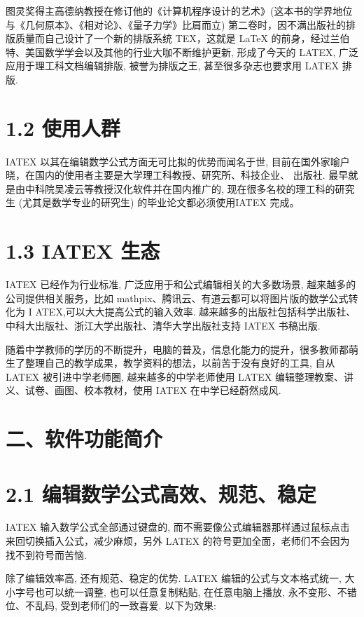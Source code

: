 \documentclass[10pt]{article}
\begin{document}
图灵奖得主高德纳教授在修订他的《计算机程序设计的艺术》(这本书的学界地位与《几何原本》、《相对论》、《量子力学》比肩而立) 第二卷时，因不满出版社的排版质量而自己设计了一个新的排版系统 TEX，这就是 LaTeX 的前身，经过兰伯特、美国数学学会以及其他的行业大咖不断维护更新, 形成了今天的 LATEX, 广泛应用于理工科文档编辑排版, 被誉为排版之王, 甚至很多杂志也要求用 LATEX 排版.

\section*{1.2 使用人群}

IATEX 以其在编辑数学公式方面无可比拟的优势而闻名于世, 目前在国外家喻户晓，在国内的使用者主要是大学理工科教授、研究所、科技企业、 出版社. 最早就是由中科院吴凌云等教授汉化软件并在国内推广的, 现在很多名校的理工科的研究生 (尤其是数学专业的研究生) 的毕业论文都必须使用IATEX 完成。

\section*{1.3 IATEX 生态}

IATEX 已经作为行业标准, 广泛应用于和公式编辑相关的大多数场景, 越来越多的公司提供相关服务，比如 mathpix、腾讯云、有道云都可以将图片版的数学公式转化为 \(\mathrm{I}\) ATEX,可以大大提高公式的输入效率. 越来越多的出版社包括科学出版社、中科大出版社、浙江大学出版社、清华大学出版社支持 IATEX 书稿出版.

随着中学教师的学历的不断提升，电脑的普及，信息化能力的提升，很多教师都萌生了整理自己的教学成果，教学资料的想法，以前苦于没有良好的工具, 自从 LATEX 被引进中学老师圈, 越来越多的中学老师使用 LATEX 编辑整理教案、讲义、试卷、画图、校本教材，使用 IATEX 在中学已经蔚然成风.

\section*{二、软件功能简介}

\section*{2.1 编辑数学公式高效、规范、稳定}

IATEX 输入数学公式全部通过键盘的, 而不需要像公式编辑器那样通过鼠标点击来回切换插入公式，减少麻烦，另外 LATEX 的符号更加全面，老师们不会因为找不到符号而苦恼.

除了编辑效率高, 还有规范、稳定的优势. LATEX 编辑的公式与文本格式统一, 大小字号也可以统一调整, 也可以任意复制粘贴, 在任意电脑上播放, 永不变形、不错位、不乱码, 受到老师们的一致喜爱. 以下为效果:
\end{document}
